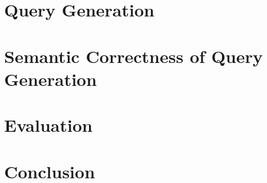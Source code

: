 \documentclass[sigconf]{acmart}
\begin{document}
\vspace*{-8pt}
\section{Query Generation}
\label{sec:query-generation}


\section{Semantic Correctness of Query Generation}
\label{sec:correctness}


\section{Evaluation}
\label{sec:performance}



\section{Conclusion}
\label{sec:conclusion}






%

\pagebreak
\onecolumn
\begin{appendix}
  
\end{appendix}
\end{document}
